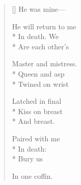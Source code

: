 \label{ch:lear_bn}
\begin{verse}[\versewidth]
He was mine---

He will return to me\\*
In death. We\\*
Are each other's

Master and mistress.\\*
Queen and asp\\*
Twined on wrist

Latched in final\\*
Kiss on breast\\*
And breast.

Paired with me\\*
In death:\qquad\\*
\hspace*{3\vgap} Bury us

In one coffin.
\end{verse}
